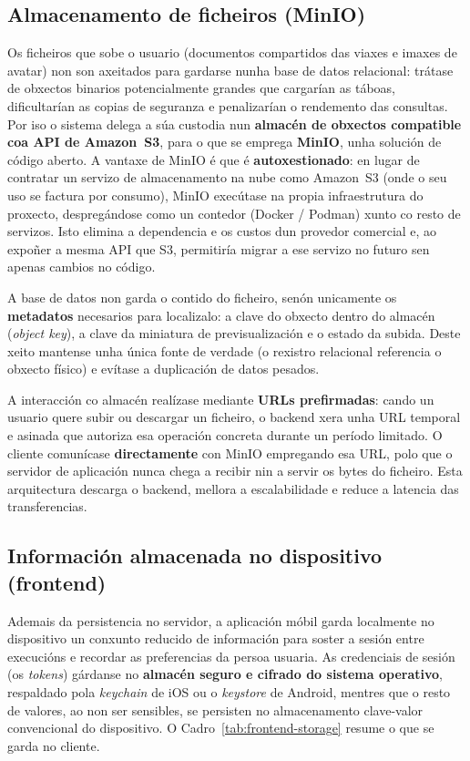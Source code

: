 \subsection{Almacenamento de ficheiros (MinIO)}

Os ficheiros que sobe o usuario (documentos compartidos das viaxes e imaxes de avatar)
non son axeitados para gardarse nunha base de datos relacional: trátase de obxectos
binarios potencialmente grandes que cargarían as táboas, dificultarían as copias de
seguranza e penalizarían o rendemento das consultas. Por iso o sistema delega a súa
custodia nun \textbf{almacén de obxectos compatible coa API de Amazon~S3}, para o que se
emprega \textbf{MinIO}, unha solución de código aberto. A vantaxe de MinIO é que é
\textbf{autoxestionado}: en lugar de contratar un servizo de almacenamento na nube como
Amazon~S3 (onde o seu uso se factura por consumo), MinIO execútase na propia
infraestrutura do proxecto, despregándose como un contedor (Docker / Podman) xunto co
resto de servizos. Isto
elimina a dependencia e os custos dun provedor comercial e, ao expoñer a mesma API que
S3, permitiría migrar a ese servizo no futuro sen apenas cambios no código.

A base de datos non garda o contido do ficheiro, senón unicamente os \textbf{metadatos}
necesarios para localizalo: a clave do obxecto dentro do almacén (\textit{object key}), a
clave da miniatura de previsualización e o estado da subida. Deste xeito mantense unha
única fonte de verdade (o rexistro relacional referencia o obxecto físico) e evítase a
duplicación de datos pesados.

A interacción co almacén realízase mediante \textbf{URLs prefirmadas}: cando un usuario
quere subir ou descargar un ficheiro, o backend xera unha URL temporal e asinada que
autoriza esa operación concreta durante un período limitado. O cliente comunícase
\textbf{directamente} con MinIO empregando esa URL, polo que o servidor de aplicación
nunca chega a recibir nin a servir os bytes do ficheiro. Esta arquitectura descarga o
backend, mellora a escalabilidade e reduce a latencia das transferencias.

\subsection{Información almacenada no dispositivo (frontend)}

Ademais da persistencia no servidor, a aplicación móbil garda localmente no dispositivo un
conxunto reducido de información para soster a sesión entre execucións e recordar as
preferencias da persoa usuaria. As credenciais de sesión (os \textit{tokens}) gárdanse no
\textbf{almacén seguro e cifrado do sistema operativo}, respaldado pola \textit{keychain}
de iOS ou o \textit{keystore} de Android, mentres que o resto de valores, ao non ser
sensibles, se persisten no almacenamento clave-valor convencional do dispositivo. O
Cadro~\ref{tab:frontend-storage} resume o que se garda no cliente.

